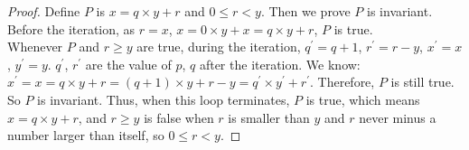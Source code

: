 \documentclass[12pt,a4paper]{article}
\theoremstyle{definition}
\numberwithin{equation}{section}
\numberwithin{figure}{section}
\begin{document}
\begin{enumerate}
\begin{enumerate}
  \begin{proof} Define $P$ is $x=q \times y+r$ and $0 \le r <y$. Then we prove $P$ is invariant. \\
  Before the iteration, as $r=x$, $x=0 \times y + x = q \times y+r$, $P$ is true.\\
  Whenever $P$ and {$r \ge y$} are true, during the iteration, $q^{'} = q+1$, $r^{'}=r-y$, $x^{'}=x$, $y^{'}=y$. $q^{'}$, $r^{'}$ are the value of $p$, $q$ after the iteration. We know: $x^{'} = x = q \times y+r = (q+1) \times y + r - y = q^{'} \times y^{'} + r^{'} $. Therefore, $P$ is still true. So $P$ is invariant.
  Thus, when this loop terminates, $P$ is true, which means $x=q \times y+r$, and $r \ge y$ is false when $r$ is smaller than $y$ and $r$ never minus a number larger than itself, so $0 \le r <y$.
  \end{proof}

\end{enumerate}
\end{enumerate}
\end{document}
